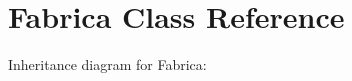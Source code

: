 \hypertarget{classFabrica}{}\section{Fabrica Class Reference}
\label{classFabrica}


Inheritance diagram for Fabrica\+:
